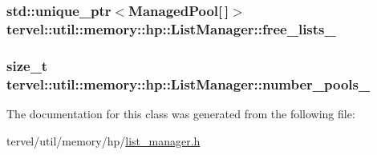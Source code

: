 \subsubsection[{free\+\_\+lists\+\_\+}]{\setlength{\rightskip}{0pt plus 5cm}std\+::unique\+\_\+ptr$<${\bf Managed\+Pool}\mbox{[}$\,$\mbox{]}$>$ tervel\+::util\+::memory\+::hp\+::\+List\+Manager\+::free\+\_\+lists\+\_\+\hspace{0.3cm}{\ttfamily [private]}}\label{classtervel_1_1util_1_1memory_1_1hp_1_1_list_manager_ab69b3baf1e6e618ae90c39694ea0baa7}
\hypertarget{classtervel_1_1util_1_1memory_1_1hp_1_1_list_manager_a5db6bf76022092febdad37d9d6db73e4}{}
\subsubsection[{number\+\_\+pools\+\_\+}]{\setlength{\rightskip}{0pt plus 5cm}size\+\_\+t tervel\+::util\+::memory\+::hp\+::\+List\+Manager\+::number\+\_\+pools\+\_\+\hspace{0.3cm}{\ttfamily [private]}}\label{classtervel_1_1util_1_1memory_1_1hp_1_1_list_manager_a5db6bf76022092febdad37d9d6db73e4}


The documentation for this class was generated from the following file\+:\begin{DoxyCompactItemize}
\item 
tervel/util/memory/hp/\hyperlink{list__manager_8h}{list\+\_\+manager.\+h}\end{DoxyCompactItemize}
